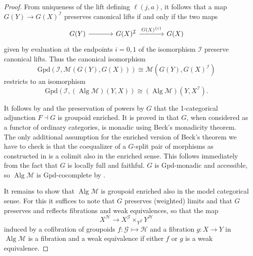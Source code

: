 \documentclass[a4paper]{article}
\theoremstyle{remark}
\theoremstyle{definition}
\begin{document}
\begin{proof}
  From uniqueness of the lift defining $\ell(j, a)$, it follows that a map $G(Y) \rightarrow G(X)^\mathcal{I}$ preserves canonical lifts if and only if the two maps
  \begin{equation}
    \begin{tikzcd}[column sep=large]
      G(Y) \arrow[r] & G(X)^\mathcal{I} \arrow[r, "G(X)^{\{i\}}"] & G(X)
    \end{tikzcd}
  \end{equation}
  given by evaluation at the endpoints $i = 0, 1$ of the isomorphism $\mathcal{I}$ preserve canonical lifts.
  Thus the canonical isomorphism
  \begin{equation}
    \mathrm{Gpd}(\mathcal{I}, \mathcal{M}(G(Y), G(X))) \cong \mathcal{M}(G(Y), G(X)^\mathcal{I})
  \end{equation}
  restricts to an isomorphism
  \begin{equation}
    \mathrm{Gpd}(\mathcal{I}, (\operatorname{Alg} \mathcal{M})(Y, X)) \cong (\operatorname{Alg} \mathcal{M})(Y, X^\mathcal{I}).
  \end{equation}

  It follows by \citet[theorem 4.85]{basic-concepts-of-enriched-category-theory} and the preservation of powers by $G$ that the 1-categorical adjunction $F \dashv G$ is groupoid enriched.
  It is proved in \citet{algebraic-models} that $G$, when considered as a functor of ordinary categories, is monadic using Beck's monadicity theorem.
  The only additional assumption for the enriched version of Beck's theorem \citep[theorem II.2.1]{enriched-kan-extensions} we have to check is that the coequalizer of a $G$-split pair of morphisms as constructed in \citet{algebraic-models} is a colimit also in the enriched sense.
  This follows immediately from the fact that $G$ is locally full and faithful.
  $G$ is $\mathrm{Gpd}$-monadic and accessible, so $\operatorname{Alg} \mathcal{M}$ is $\mathrm{Gpd}$-cocomplete by \citet[theorem 3.8]{two-dimensional-monad-theory}.

  It remains to show that $\operatorname{Alg} \mathcal{M}$ is groupoid enriched also in the model categorical sense.
  For this it suffices to note that $G$ preserves (weighted) limits and that $G$ preserves and reflects fibrations and weak equivalences, so that the map
  \begin{equation}
    X^\mathcal{H} \rightarrow X^\mathcal{G} \times_{Y^\mathcal{G}} Y^\mathcal{H}
  \end{equation}
  induced by a cofibration of groupoids $f : \mathcal{G} \rightarrowtail \mathcal{H}$ and a fibration $g : X \rightarrow Y$ in $\operatorname{Alg} \mathcal{M}$ is a fibration and a weak equivalence if either $f$ or $g$ is a weak equivalence.
\end{proof}
\end{document}
